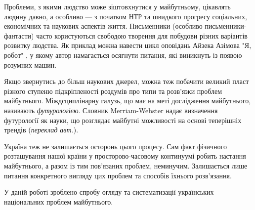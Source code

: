 \intro
\pagestyle{plain}

Проблеми, з якими людство може зіштовхнутися у майбутньому, цікавлять людину давно, а особливо --- з початком НТР та швидкого прогресу 
соціальних, економічних та наукових аспектів життя. Письменники (особливо письменники-фантасти) часто користуються 
свободою творення для побудови різних варіантів розвитку людства. Як приклад можна навести цикл оповідань Айзека 
Азімова "Я, робот" \cite{asimov1950robot}, у якому автор намагається осягнути питання, які виникнуть із появою розумних 
машин. 

Якщо звернутись до більш наукових джерел, можна теж побачити великий пласт різного ступеню підкріпленості роздумів про 
типи та розв'язки проблем майбутнього. Міждсциплінарну галузь, що має на меті дослідження майбутнього, називають 
\emph{футурологією}. Словник Merriam-Webster \cite{MerriamWebster2009} надає визначення футурології як науки, що 
розглядає майбутні можливості на основі теперішніх трендів (\emph{переклад авт.}).

Україна теж не залишається осторонь цього процесу. Сам факт фізичного
 розташування нашої країни у просторово-часовому континуумі робить
 настання майбутнього, а разом із тим пов'язаних проблем, неминучим. Залишається лише питання
 конкретного вигляду цих проблем та способів їхнього розв'язання.

 У даній роботі зроблено спробу огляду та систематизації українських національних проблем майбутнього.